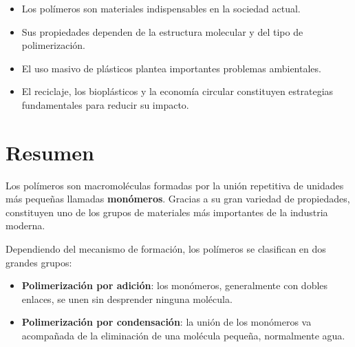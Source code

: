 \begin{tcolorbox}[
title=Ideas clave,
colback=blue!5,
colframe=blue!70!black]

\begin{itemize}

\item Los polímeros son materiales indispensables en la sociedad actual.

\item Sus propiedades dependen de la estructura molecular y del tipo de polimerización.

\item El uso masivo de plásticos plantea importantes problemas ambientales.

\item El reciclaje, los bioplásticos y la economía circular constituyen estrategias
fundamentales para reducir su impacto.

\end{itemize}

\end{tcolorbox}


\section{Resumen}

Los polímeros son macromoléculas formadas por la unión repetitiva de unidades
más pequeñas llamadas \textbf{monómeros}. Gracias a su gran variedad de propiedades,
constituyen uno de los grupos de materiales más importantes de la industria moderna.

Dependiendo del mecanismo de formación, los polímeros se clasifican en dos grandes
grupos:

\begin{itemize}

\item \textbf{Polimerización por adición}: los monómeros, generalmente con dobles
enlaces, se unen sin desprender ninguna molécula.

\item \textbf{Polimerización por condensación}: la unión de los monómeros va
acompañada de la eliminación de una molécula pequeña, normalmente agua.

\end{itemize}

